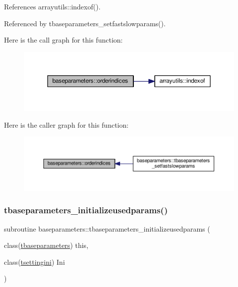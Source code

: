 References arrayutils\+::indexof().



Referenced by tbaseparameters\+\_\+setfastslowparams().

Here is the call graph for this function\+:
\nopagebreak
\begin{figure}[H]
\begin{center}
\leavevmode
\includegraphics[width=350pt]{namespacebaseparameters_a7d00d4d42d3c3abcbdbc6078fffab95f_cgraph}
\end{center}
\end{figure}
Here is the caller graph for this function\+:
\nopagebreak
\begin{figure}[H]
\begin{center}
\leavevmode
\includegraphics[width=350pt]{namespacebaseparameters_a7d00d4d42d3c3abcbdbc6078fffab95f_icgraph}
\end{center}
\end{figure}
\mbox{\label{namespacebaseparameters_a86f36ece3b30fc7984f06ee4aad097bb}} 
\subsubsection{\texorpdfstring{tbaseparameters\+\_\+initializeusedparams()}{tbaseparameters\_initializeusedparams()}}
{\footnotesize\ttfamily subroutine baseparameters\+::tbaseparameters\+\_\+initializeusedparams (\begin{DoxyParamCaption}\item[{class(\mbox{\hyperlink{structbaseparameters_1_1tbaseparameters}{tbaseparameters}})}]{this,  }\item[{class(\mbox{\hyperlink{structsettings_1_1tsettingini}{tsettingini}})}]{Ini }\end{DoxyParamCaption})\hspace{0.3cm}{\ttfamily [private]}}



